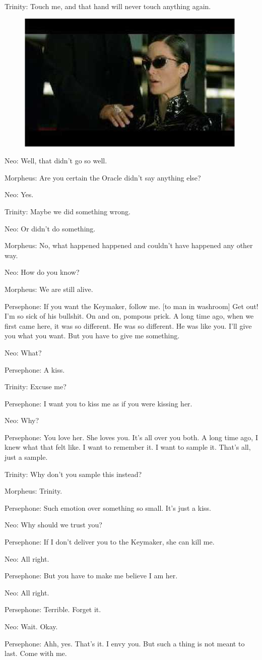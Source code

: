 \documentclass{ctexart}
\newenvironment{myquote}{\color{green} \setlength{\leftskip}{6em} \setlength{\rightskip}{4em} \setlength{\parindent}{-2em}}{\par}
\begin{document}
\begin{myquote}
Trinity: Touch me, and that hand will never touch anything again.

\begin{figure}[htb]
\centering
\includegraphics[width=0.5\linewidth]{fig/read_reloaded-100}
\end{figure}

Neo: Well, that didn't go so well.

Morpheus: Are you certain the Oracle didn't say anything else?

Neo: Yes.

Trinity: Maybe we did something wrong.

Neo: Or didn't do something.

Morpheus: No, what happened happened and couldn't have happened any other way.

Neo: How do you know?

Morpheus: We are still alive.

Persephone: If you want the Keymaker, follow me. [to man in washroom] Get out! I'm so sick of his bullshit. On and on, pompous prick. A long time ago, when we first came here, it was so different. He was so different. He was like you. I'll give you what you want. But you have to give me something.

Neo: What?

Persephone: A kiss.

Trinity: Excuse me?

Persephone: I want you to kiss me as if you were kissing her.

Neo: Why?

Persephone: You love her. She loves you. It's all over you both. A long time ago, I knew what that felt like. I want to remember it. I want to sample it. That's all, just a sample.

Trinity: Why don't you sample this instead?

Morpheus: Trinity.

Persephone: Such emotion over something so small. It's just a kiss.

Neo: Why should we trust you?

Persephone: If I don't deliver you to the Keymaker, she can kill me.

Neo: All right.

Persephone: But you have to make me believe I am her.

Neo: All right.

Persephone: Terrible. Forget it.

Neo: Wait. Okay.

Persephone: Ahh, yes. That's it. I envy you. But such a thing is not meant to last. Come with me.
\end{myquote}
\end{document}
